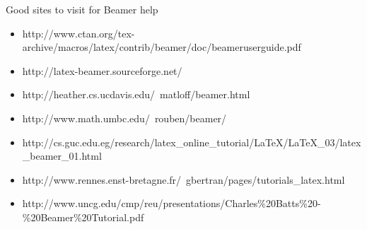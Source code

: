 \documentclass[pdf]{beamer}
\begin{document}
\begin{frame}{Good sites to visit for Beamer help}
\begin{itemize}
	\item \htmladdnormallink{\underline{\textcolor{blue}{The Beamer	User Guide}}}
	{http://www.ctan.org/tex-archive/macros/latex/contrib/beamer/doc/beameruserguide.pdf}
	\item \htmladdnormallink{\underline{\textcolor{blue}{The Beamer Homepage}}}
	{http://latex-beamer.sourceforge.net/}		
	\item \htmladdnormallink{\underline{\textcolor{blue}{A Quick Tutorial}}}
	{http://heather.cs.ucdavis.edu/~matloff/beamer.html}
	\item \htmladdnormallink{\underline{\textcolor{blue}{A Beamer Quickstart}}}
	{http://www.math.umbc.edu/~rouben/beamer/}
	\item \htmladdnormallink{\underline{\textcolor{blue}{A Long Tutorial}}}
	{http://cs.guc.edu.eg/research/latex_online_tutorial/LaTeX/LaTeX_03/latex_beamer_01.html}
	\item \htmladdnormallink{\underline{\textcolor{blue}{\LaTeX\ + Beamer Examples}}}
	{http://www.rennes.enst-bretagne.fr/~gbertran/pages/tutorials_latex.html}
	\item \htmladdnormallink{\underline{\textcolor{blue}{A Beamer Presentation on Beamer}}}
	{http://www.uncg.edu/cmp/reu/presentations/Charles\%20Batts\%20-\%20Beamer\%20Tutorial.pdf}
\end{itemize}
\end{frame}
\end{document}
